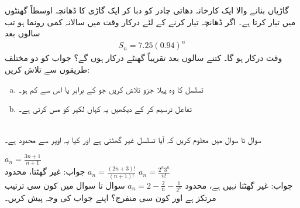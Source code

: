 گاڑیاں بنانے والا ایک کارخانہ دھاتی چادر کو دبا کر ایک گاڑی  کا ڈھانچہ  اوسطاً  گھنٹوں میں تیار کرتا ہے۔ اگر ڈھانچہ تیار کرنے کے لئے درکار وقت میں سالانہ   کمی رونما ہو تب  سالوں بعد
\begin{align*}
S_n=7.25(0.94)^n
\end{align*} 
وقت درکار ہو گا۔ کتنے سالوں بعد تقریباً  گھنٹے درکار ہوں گے؟ جواب کو دو مختلف طریقوں سے تلاش کریں:
\begin{enumerate}[a.]
\item
تسلسل  کا وہ پہلا جزو تلاش کریں جو  کے برابر یا اس سے کم ہو۔
\item
تفاعل  ترسیم کر کے دیکھیں یہ کہاں لکیر  کو مس کرتی ہے۔
\end{enumerate}
\\
سوال  تا سوال  میں معلوم کریں کہ آیا تسلسل غیر گھٹتی ہے اور کیا یہ اوپر سے محدود ہے۔

$a_n=\frac{3n+1}{n+1}$\\
جواب:\quad
غیر گھٹتا، محدود
$a_n=\frac{(2n+3)!}{(n+1)!}$
$a_n=\frac{2^n3^n}{n!}$\\
جواب:\quad
غیر گھٹتا نہیں ہے، محدود
$a_n=2-\frac{2}{n}-\frac{1}{2^n}$
سوال  تا سوال  میں کون سی ترتیب مرتکز ہے اور کون سی منفرج؟ اپنے جواب کی وجہ پیش کریں۔

